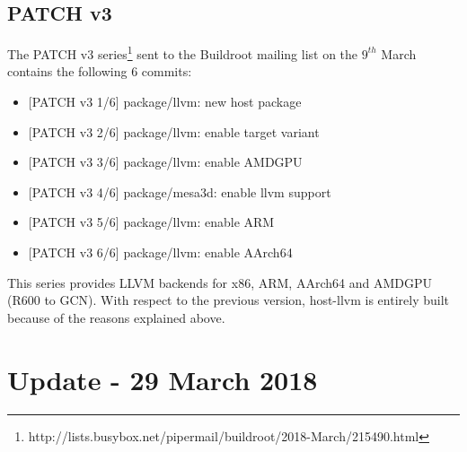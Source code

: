 \documentclass[12pt,a4paper,oneside]{article}
\begin{document}
\subsection*{PATCH v3}
The PATCH v3 series\footnote{http://lists.busybox.net/pipermail/buildroot/2018-March/215490.html}
sent to the Buildroot mailing list on the $9^{th}$ March contains the following
6 commits:
\begin{itemize}
  \item {[PATCH v3 1/6]} package/llvm: new host package
  \item {[PATCH v3 2/6]} package/llvm: enable target variant
  \item {[PATCH v3 3/6]} package/llvm: enable AMDGPU
  \item {[PATCH v3 4/6]} package/mesa3d: enable llvm support
  \item {[PATCH v3 5/6]} package/llvm: enable ARM
  \item {[PATCH v3 6/6]} package/llvm: enable AArch64
\end{itemize}
This series provides LLVM backends for x86, ARM, AArch64 and AMDGPU (R600 to
GCN). With respect to the previous version, host-llvm is entirely built because
of the reasons explained above.

\newpage
\section*{Update - 29 March 2018}
\end{document}
